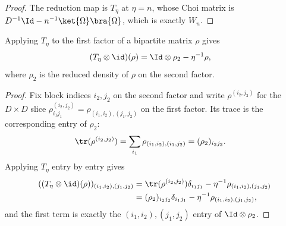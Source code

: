 \begin{proof}
    \leanok
    The reduction map is $T_\eta$ at $\eta=n$, whose Choi matrix is
    $D^{-1}\Id-n^{-1}\ket{\Omega}\bra{\Omega}$, which is exactly $W_n$.
\end{proof}

\begin{theorem}
    \label{thm:tensor_map_id_t_eta}
    \leanok
    Applying $T_\eta$ to the first factor of a bipartite matrix $\rho$ gives
    \begin{align}
        (T_\eta\otimes\id)(\rho) & =\Id\otimes\rho_2-\eta^{-1}\rho,
        \notag
    \end{align}
    where $\rho_2$ is the reduced density of $\rho$ on the second factor.
\end{theorem}

\begin{proof}
    \leanok
    Fix block indices $i_2,j_2$ on the second factor and write $\rho^{(i_2,j_2)}$
    for the $D\times D$ slice $\rho^{(i_2,j_2)}_{i_1 j_1}=\rho_{(i_1,i_2),(j_1,j_2)}$
    on the first factor. Its trace is the corresponding entry of $\rho_2$:
    \begin{align}
        \tr(\rho^{(i_2,j_2)})
         & =\sum_{i_1}\rho_{(i_1,i_2),(i_1,j_2)}
        =(\rho_2)_{i_2 j_2}.
        \notag
    \end{align}
    Applying $T_\eta$ entry by entry gives
    \begin{align}
        ((T_\eta\otimes\id)(\rho))_{(i_1,i_2),(j_1,j_2)}
         & =\tr(\rho^{(i_2,j_2)}) \delta_{i_1 j_1}
        -\eta^{-1}\rho_{(i_1,i_2),(j_1,j_2)}
        \notag                                     \\
         & =(\rho_2)_{i_2 j_2} \delta_{i_1 j_1}
        -\eta^{-1}\rho_{(i_1,i_2),(j_1,j_2)},
        \notag
    \end{align}
    and the first term is exactly the $(i_1,i_2),(j_1,j_2)$ entry of
    $\Id\otimes\rho_2$.
\end{proof}

